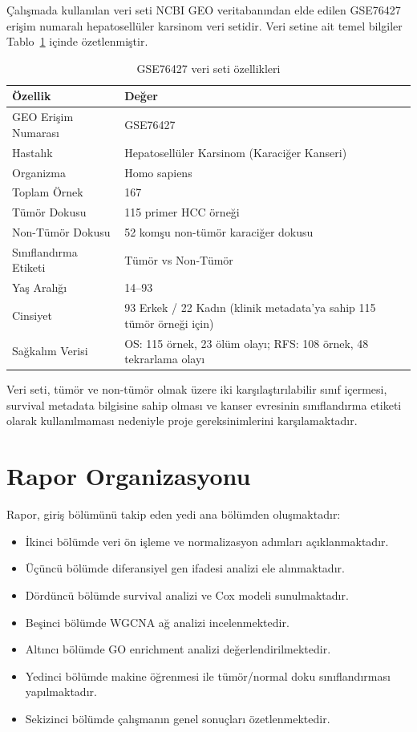 \documentclass[12pt,a4paper,oneside]{report}
\begin{document}
Çalışmada kullanılan veri seti NCBI GEO veritabanından elde edilen GSE76427 erişim numaralı hepatosellüler karsinom veri setidir. Veri setine ait temel bilgiler Tablo~\ref{tab:dataset} içinde özetlenmiştir.

\begin{table}[H]
\centering
\caption{GSE76427 veri seti özellikleri}
\label{tab:dataset}
\begin{tabularx}{\textwidth}{l X}
\toprule
\textbf{Özellik} & \textbf{Değer} \\
\midrule
GEO Erişim Numarası & GSE76427 \\
Hastalık & Hepatosellüler Karsinom (Karaciğer Kanseri) \\
Organizma & Homo sapiens \\
Toplam Örnek & 167 \\
Tümör Dokusu & 115 primer HCC örneği \\
Non-Tümör Dokusu & 52 komşu non-tümör karaciğer dokusu \\
Sınıflandırma Etiketi & Tümör vs Non-Tümör \\
Yaş Aralığı & 14--93 \\
Cinsiyet & 93 Erkek / 22 Kadın (klinik metadata’ya sahip 115 tümör örneği için)\\
Sağkalım Verisi & OS: 115 örnek, 23 ölüm olayı; RFS: 108 örnek, 48 tekrarlama olayı \\
\bottomrule
\end{tabularx}
\end{table}

Veri seti, tümör ve non-tümör olmak üzere iki karşılaştırılabilir sınıf içermesi, survival metadata bilgisine sahip olması ve kanser evresinin sınıflandırma etiketi olarak kullanılmaması nedeniyle proje gereksinimlerini karşılamaktadır.

\section{Rapor Organizasyonu}

Rapor, giriş bölümünü takip eden yedi ana bölümden oluşmaktadır:

\begin{itemize}
    \item İkinci bölümde veri ön işleme ve normalizasyon adımları açıklanmaktadır.
    \item Üçüncü bölümde diferansiyel gen ifadesi analizi ele alınmaktadır.
    \item Dördüncü bölümde survival analizi ve Cox modeli sunulmaktadır.
    \item Beşinci bölümde WGCNA ağ analizi incelenmektedir.
    \item Altıncı bölümde GO enrichment analizi değerlendirilmektedir.
    \item Yedinci bölümde makine öğrenmesi ile tümör/normal doku sınıflandırması yapılmaktadır.
    \item Sekizinci bölümde çalışmanın genel sonuçları özetlenmektedir.
\end{itemize}
\end{document}
